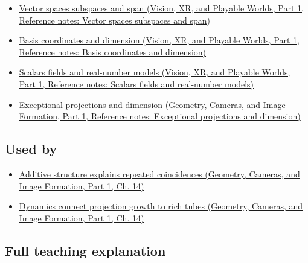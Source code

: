 \hypertarget{appendix-b0732b22e7d6-prerequisites}{}

\begin{itemize}
\tightlist
\item
  \href{../07-Vision-XR-and-Playable-Worlds-P01/main.pdf\#nameddest=appendix-173b52c063ae}{Vector spaces subspaces and span (Vision, XR, and Playable Worlds, Part 1, Reference notes: Vector spaces subspaces and span)}
\item
  \href{../07-Vision-XR-and-Playable-Worlds-P01/main.pdf\#nameddest=appendix-ce0341f7ea0d}{Basis coordinates and dimension (Vision, XR, and Playable Worlds, Part 1, Reference notes: Basis coordinates and dimension)}
\item
  \href{../07-Vision-XR-and-Playable-Worlds-P01/main.pdf\#nameddest=appendix-52051ad550fe}{Scalars fields and real-number models (Vision, XR, and Playable Worlds, Part 1, Reference notes: Scalars fields and real-number models)}
\item
  \href{../03-Geometry-Cameras-and-Image-Formation-P01/main.pdf\#nameddest=appendix-3c73f7862157}{Exceptional projections and dimension (Geometry, Cameras, and Image Formation, Part 1, Reference notes: Exceptional projections and dimension)}
\end{itemize}

\subsection{Used by}\label{appendix-b0732b22e7d6-used-by}

\hypertarget{appendix-b0732b22e7d6-used-by}{}

\begin{itemize}
\tightlist
\item
  \href{../03-Geometry-Cameras-and-Image-Formation-P01/main.pdf\#nameddest=04-visual-computing-ii-ch033-additive-structure-explains-repeated-coincidences}{Additive structure explains repeated coincidences (Geometry, Cameras, and Image Formation, Part 1, Ch. 14)}
\item
  \href{../03-Geometry-Cameras-and-Image-Formation-P01/main.pdf\#nameddest=04-visual-computing-ii-ch033-dynamics-connect-projection-growth-to-rich-tubes}{Dynamics connect projection growth to rich tubes (Geometry, Cameras, and Image Formation, Part 1, Ch. 14)}
\end{itemize}

\subsection{Full teaching explanation}\label{appendix-b0732b22e7d6-full-teaching-explanation}


